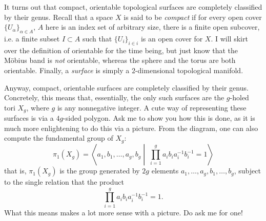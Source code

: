 \documentclass{axolotl}
\begin{document}
It turns out that compact, orientable topological surfaces are completely
classified by their genus. Recall that a space \(X\) is said to be
\emph{compact} if for every open cover \(\{U_\alpha\}_{\alpha \in A}\), \(A\)
here is an index set of arbitrary size, there is a finite open subcover, i.e. a
finite subset \(I \subset A\) such that \(\{U_i\}_{i \in i}\) is an open cover
for \(X\). I will skirt over the definition of orientable for the time being,
but just know that the M\"obius band is \emph{not} orientable, whereas the
sphere and the torus are both orientable. Finally, a \emph{surface} is simply
a \(2\)-dimensional topological manifold.

Anyway, compact, orientable surfaces are completely classified by their genus.
Concretely, this means that, essentially, the only such surfaces are the
\(g\)-holed tori \(X_g\), where \(g\) is any nonnegative integer. A cute way of representing
these surfaces is via a \(4g\)-sided polygon. Ask me to show you how this is done,
as it is much more enlightening to do this via a picture. From the diagram, one
can also compute the fundamental group of \(X_g\):
\[ \pi_1(X_g) = \left\langle a_1,b_1,\ldots,a_g,b_g \middle|\;\prod^g_{i = 1} a_ib_ia_i^{-1}b_i^{-1} = 1\right\rangle \]
that is, \(\pi_1(X_g)\) is the group generated by \(2g\) elements \(a_1,\ldots,a_g,b_1,\ldots,b_g\),
subject to the single relation that the product
\[ \prod^g_{i = 1} a_ib_ia_i^{-1}b_i^{-1} = 1. \]
What this means makes a lot more sense with a picture. Do ask me for one!
\end{document}
